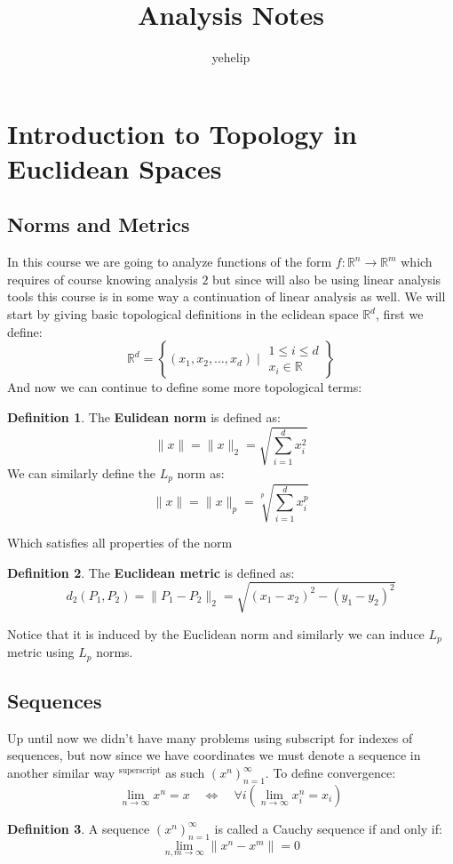 \documentclass[11pt,a4paper]{article}
\title{\textbf{Analysis Notes}}
\author{yehelip}
\date{}
\theoremstyle{definition}
\newtheorem{definition}{Definition}[section]
\theoremstyle{plain}
\newcommand{\R}{\mathbb{R}}
\newcommand{\set}[2]{ \left\{ #1 \mid #2 \right\} }
\begin{document}
	\maketitle
	\newpage
	\section{Introduction to Topology in Euclidean Spaces}
	\subsection{Norms and Metrics}
	In this course we are going to analyze functions of the form 
	$f\colon \R^n\to\R^m$ which requires of course knowing analysis $2$ but
	since will also be using linear analysis tools this course is in
	some way a continuation of linear analysis as well. We will
	start by giving basic topological definitions in the eclidean
	space $\R^d$, first we define:
	\[
		\R^d = \set{(x_1,x_2,\dots,x_d)}{\substack{1 \le i \le d \\ x_i\in\R}}
	\]
	And now we can continue to define some more topological terms:
	\begin{definition}
	The \textbf{Eulidean norm} is defined as:
	\[
		\|x\| = \|x\|_2 = \sqrt{\sum_{i=1}^{d}{x_i^2}}
	\]
	We can similarly define the $L_p$ norm as:
	\[
		\|x\| = \|x\|_p = \sqrt[p]{\sum_{i=1}^{d}{x_i^p}}
	\]
	\end{definition}
	\noindent Which satisfies all properties of the norm
	\begin{definition}
	The \textbf{Euclidean metric} is defined as:
	\[
		d_2(P_1,P_2) = \|P_1-P_2\|_2 = \sqrt{(x_1-x_2)^2 - (y_1-y_2)^2}
	\]
	\end{definition}
	\noindent Notice that it is induced by the Euclidean norm and similarly
	we can induce $L_p$ metric using $L_p$ norms.
	\subsection{Sequences}
	Up until now we didn't have many problems using subscript for indexes
	of sequences, but now since we have coordinates we must denote a sequence
	in another similar way $^{\text{superscript}}$ as such 
	$(x^n)_{n=1}^{\infty}$. To define convergence:
	\[
		\lim_{n\to\infty}{x^n} = x 
		\quad \iff \quad
		\forall i\left(\lim_{n\to\infty}{x_i^n} = x_i\right)
	\]
	\begin{definition}
	A sequence $(x^n)_{n=1}^{\infty}$ is called a Cauchy sequence if and only 
	if:
	\[
		\lim_{n,m\to\infty}{\|x^n-x^m\|} = 0
	\]
	\end{definition}
	
\end{document}
